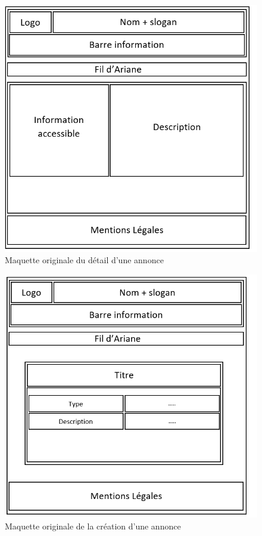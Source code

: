 \documentclass[a4paper,11pt]{article}
\begin{document}
\begin{figure}[H]
  \includegraphics[width=\linewidth]{../Conception/maquette/maquette-detail-annonce-original.png}
  \caption{Maquette originale du détail d'une annonce}
  \label{fig:maquette-detail-annonce-original}
\end{figure}

\begin{figure}[H]
  \includegraphics[width=\linewidth]{../Conception/maquette/maquette-creation-annonce-original.png}
  \caption{Maquette originale de la création d'une annonce}
  \label{fig:maquette-creation-annonce-original}
\end{figure}
\newpage
\end{document}
